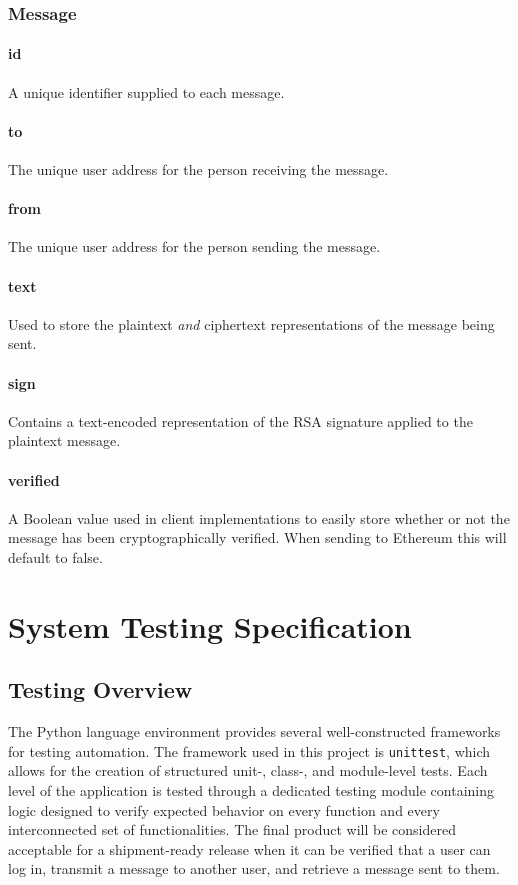 \documentclass[titlepage]{report}
\begin{document}
\subsection{Message}
\subsubsection{id}
A unique identifier supplied to each message.

\subsubsection{to}
The unique user address for the person receiving the message.

\subsubsection{from}
The unique user address for the person sending the message.

\subsubsection{text}
Used to store the plaintext \textit{and} ciphertext representations of the message being sent.

\subsubsection{sign}
Contains a text-encoded representation of the RSA signature applied to the plaintext message.

\subsubsection{verified}
A Boolean value used in client implementations to easily store whether or not the message has been cryptographically verified. When sending to \gls{Ethereum} this will default to false.

\chapter{System Testing Specification}
\section{Testing Overview}
The Python language environment provides several well-constructed frameworks for testing automation. The framework used in this project is \texttt{unittest}\cite{unittest}, which allows for the creation of structured unit-, class-, and module-level tests. Each level of the application is tested through a dedicated testing module containing logic designed to verify expected behavior on every function and every interconnected set of functionalities. The final product will be considered acceptable for a shipment-ready release when it can be verified that a user can log in, transmit a message to another user, and retrieve a message sent to them.
\end{document}
